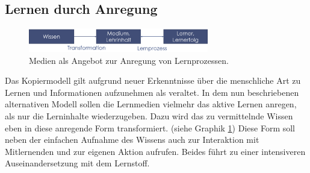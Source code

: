 \subsection{Lernen durch Anregung}
\label{sub:LernenDurchAnregung}
\begin{figure}[h]
	\centering
	\includegraphics[width=0.7\textwidth]{Abbildungen/Anregungsmodell.PNG}
	\caption{Medien als Angebot zur Anregung von Lernprozessen. \cite[S. 147]{Kerres.2001}}
	\label{fig:Kerres2001_LernenDurchAnregung}
\end{figure}
Das Kopiermodell gilt aufgrund neuer Erkenntnisse über die menschliche Art zu Lernen und Informationen aufzunehmen als veraltet.
In dem nun beschriebenen alternativen Modell sollen die Lernmedien vielmehr das aktive Lernen anregen, als nur die Lerninhalte wiederzugeben. 
Dazu wird das zu vermittelnde Wissen eben in diese anregende Form transformiert. (siehe Graphik \ref{fig:Kerres2001_LernenDurchAnregung}) Diese Form soll neben der einfachen Aufnahme des Wissens auch zur Interaktion mit Mitlernenden und zur eigenen Aktion aufrufen. Beides führt zu einer intensiveren Auseinandersetzung mit dem Lernstoff. \cite[S. 147 f.]{Kerres.2001}